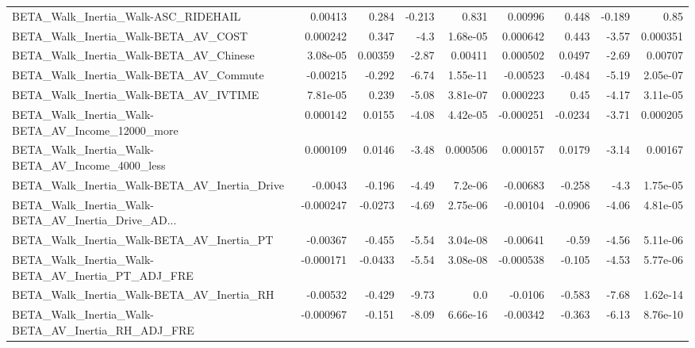 \begin{tabular}{lrrrrrrrr}
BETA\_Walk\_Inertia\_Walk-ASC\_RIDEHAIL                &     0.00413 &        0.284 &   -0.213 &    0.831 &    0.00996 &       0.448 &       -0.189 &          0.85 \\
BETA\_Walk\_Inertia\_Walk-BETA\_AV\_COST                &    0.000242 &        0.347 &     -4.3 & 1.68e-05 &   0.000642 &       0.443 &        -3.57 &      0.000351 \\
BETA\_Walk\_Inertia\_Walk-BETA\_AV\_Chinese             &    3.08e-05 &      0.00359 &    -2.87 &  0.00411 &   0.000502 &      0.0497 &        -2.69 &       0.00707 \\
BETA\_Walk\_Inertia\_Walk-BETA\_AV\_Commute             &    -0.00215 &       -0.292 &    -6.74 & 1.55e-11 &   -0.00523 &      -0.484 &        -5.19 &      2.05e-07 \\
BETA\_Walk\_Inertia\_Walk-BETA\_AV\_IVTIME              &    7.81e-05 &        0.239 &    -5.08 & 3.81e-07 &   0.000223 &        0.45 &        -4.17 &      3.11e-05 \\
BETA\_Walk\_Inertia\_Walk-BETA\_AV\_Income\_12000\_more   &    0.000142 &       0.0155 &    -4.08 & 4.42e-05 &  -0.000251 &     -0.0234 &        -3.71 &      0.000205 \\
BETA\_Walk\_Inertia\_Walk-BETA\_AV\_Income\_4000\_less    &    0.000109 &       0.0146 &    -3.48 & 0.000506 &   0.000157 &      0.0179 &        -3.14 &       0.00167 \\
BETA\_Walk\_Inertia\_Walk-BETA\_AV\_Inertia\_Drive       &     -0.0043 &       -0.196 &    -4.49 &  7.2e-06 &   -0.00683 &      -0.258 &         -4.3 &      1.75e-05 \\
BETA\_Walk\_Inertia\_Walk-BETA\_AV\_Inertia\_Drive\_AD... &   -0.000247 &      -0.0273 &    -4.69 & 2.75e-06 &   -0.00104 &     -0.0906 &        -4.06 &      4.81e-05 \\
BETA\_Walk\_Inertia\_Walk-BETA\_AV\_Inertia\_PT          &    -0.00367 &       -0.455 &    -5.54 & 3.04e-08 &   -0.00641 &       -0.59 &        -4.56 &      5.11e-06 \\
BETA\_Walk\_Inertia\_Walk-BETA\_AV\_Inertia\_PT\_ADJ\_FRE  &   -0.000171 &      -0.0433 &    -5.54 & 3.08e-08 &  -0.000538 &      -0.105 &        -4.53 &      5.77e-06 \\
BETA\_Walk\_Inertia\_Walk-BETA\_AV\_Inertia\_RH          &    -0.00532 &       -0.429 &    -9.73 &      0.0 &    -0.0106 &      -0.583 &        -7.68 &      1.62e-14 \\
BETA\_Walk\_Inertia\_Walk-BETA\_AV\_Inertia\_RH\_ADJ\_FRE  &   -0.000967 &       -0.151 &    -8.09 & 6.66e-16 &   -0.00342 &      -0.363 &        -6.13 &      8.76e-10 \\

\end{tabular}
